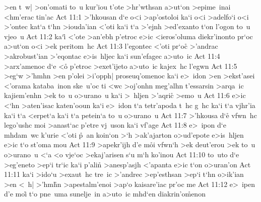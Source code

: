 >en
t~w|
>on'omati
to~u
kur'iou
t'ote
>hr'wthsan
a>ut`on
>epime~inai
<hm'erac
tin'ac\bibvsend
\vs Act 11:1
>'hkousan
d`e
o<i
>ap'ostoloi
ka`i
o<i
>adelfo`i
o<i
>'ontec
kat`a
t`hn
>iouda'ian
<'oti
ka`i
t`a
>'ejnh
>ed'exanto
t`on
l'ogon
to~u
vjeo~u\bibvsend
\vs Act 11:2
ka`i\r{}
<'ote
>an'ebh
p'etroc
e>ic
<ieros'oluma
diekr'inonto
pr`oc
a>ut`on
o<i
>ek
peritom~hc\bibvsend
\vs Act 11:3
l'egontec
<'oti
pr`oc\r{}
>'andrac
>akrobust'ian
>'eqontac
e>is~hljec
ka`i
sun'efagec
a>uto~ic\bibvsend
\vs Act 11:4
>arx'amenoc
d`e
<o\r{}
p'etroc
>exet'ijeto
a>uto~ic
kajex~hc
l'egwn\bibvsend
\vs Act 11:5
>eg`w
>'hmhn
>en
p'olei
>i'opph|
proseuq'omenoc
ka`i
e>~idon
>en
>ekst'asei
<'orama
kataba~inon
ske~u'oc
ti
<wc
>oj'onhn
meg'alhn
t'essarsin
>arqa~ic
kajiem'enhn
>ek
to~u
o>urano~u
ka`i
>~hljen
>'aqri\r{c}
>emo~u\bibvsend
\vs Act 11:6
e>ic
<`hn
>aten'isac
katen'ooun
ka`i
e>~idon
t`a
tetr'apoda
t~hc
g~hc
ka`i
t`a
vjhr'ia
ka`i
t`a
<erpet`a
ka`i
t`a
petein`a
to~u
o>urano~u\bibvsend
\vs Act 11:7
>'hkousa
d`e\r{}
vfwn~hc
lego'ushc
moi
>anast`ac
p'etre
vj~uson
ka`i
vf'age\bibvsend
\vs Act 11:8
e>~ipon
d`e
mhdam~wc
k'urie
<'oti
\r{p}~an
koin`on
>`h
>ak'ajarton
o>ud'epote
e>is~hljen
e>ic
t`o
st'oma
mou\bibvsend
\vs Act 11:9
>apekr'ijh
d'e
m\r{o}i
vfwn`h
>ek
deut'erou
>ek
to~u
o>urano~u
<`a
<o
vje`oc
>ekaj'arisen
s`u
m`h
ko'inou\bibvsend
\vs Act 11:10
to~uto
d`e
>eg'eneto
>ep`i
tr`ic
ka`i
p'alin\r{}
>anesp'asjh
<'apanta
e>ic
t`on
o>uran'on\bibvsend
\vs Act 11:11
ka`i
>ido`u
>exaut~hc
tre~ic
>'andrec
>ep'esthsan
>ep`i
t`hn
o>ik'ian
>en
<~h|
>'hm\r{h}n
>apestalm'enoi
>ap`o
kaisare'iac
pr'oc
me\bibvsend
\vs Act 11:12
e>~ipen
d'e
moi\r{}
t`o
pne~uma
sunelje~in
a>uto~ic
mhd`en
diakrin'o\r{m}enon
